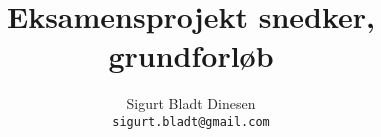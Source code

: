 \documentclass[a4paper, titlepage]{report}
\renewcommand{\%}{\scalebox{.9}{\oldpct}}
\begin{document}
\title{Eksamensprojekt snedker, grundforløb}
\author{Sigurt Bladt Dinesen
	\\\texttt{sigurt.bladt@gmail.com}
}

\maketitle



\end{document}
